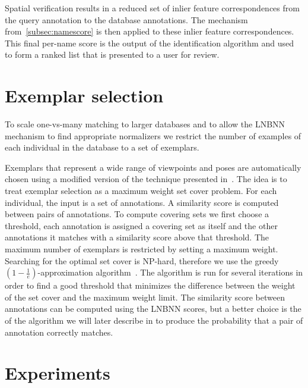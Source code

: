         Spatial verification results in a reduced set of inlier feature correspondences from the query annotation
        to the database annotations. The \namescoring{} mechanism from~\cref{subsec:namescore} is then applied to
        these inlier feature correspondences. This final per-name score is the output of the identification
        algorithm and used to form a ranked list that is presented to a user for review.

     \sver{}
     \FloatBarrier


\section{Exemplar selection}\label{sec:exempselect}
    To scale one-vs-many matching to larger databases and to allow the LNBNN mechanism to find appropriate
    normalizers we restrict the number of examples of each individual in the database to a set of exemplars.

    Exemplars that represent a wide range of viewpoints and poses are automatically chosen using a modified version
    of the technique presented in~\cite{oddone_mobile_2016}. The idea is to treat exemplar selection as a maximum
    weight set cover problem. For each individual, the input is a set of annotations. A similarity score is
    computed between pairs of annotations. To compute covering sets we first choose a threshold, each annotation is
    assigned a covering set as itself and the other annotations it matches with a similarity score above that
    threshold. The maximum number of exemplars is restricted by setting a maximum weight. Searching for the optimal
    set cover is NP-hard, therefore we use the greedy %
    $(1 - \frac{1}{e})$-approximation algorithm~\cite{michael_guide_1979}. The algorithm is run for several
    iterations in order to find a good threshold that minimizes the difference between the weight of the set cover
    and the maximum weight limit. The similarity score between annotations can be computed using the LNBNN scores,
    but a better choice is the of the algorithm we will later describe in  to produce the
    probability that a pair of annotation correctly matches.


\section{Experiments}\label{sec:rankexpt}

